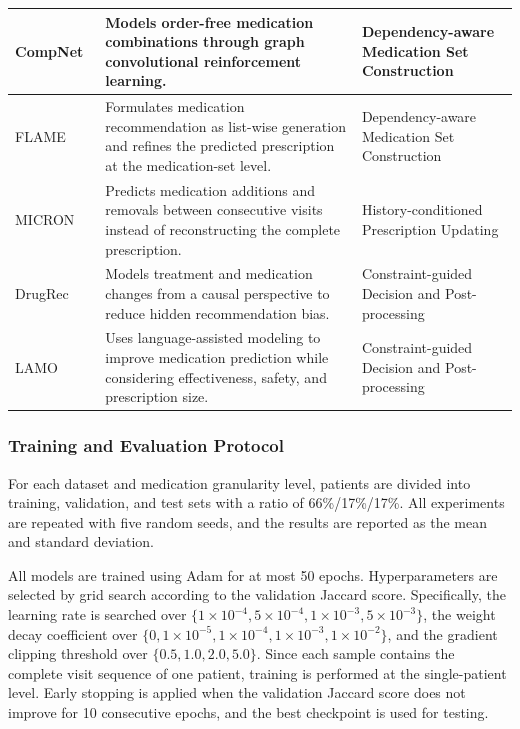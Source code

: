 \documentclass[manuscript,review]{acmart}
\begin{document}
\begin{longtable}{
    @{}
    L{0.13\textwidth}
    L{0.54\textwidth}
    L{0.27\textwidth}
    @{}
}
CompNet~\cite{wang2019compnet} &
Models order-free medication combinations through graph convolutional reinforcement learning. &
Dependency-aware Medication Set Construction \\
\hline

FLAME~\cite{fan2026fine} &
Formulates medication recommendation as list-wise generation and refines the predicted prescription at the medication-set level. &
Dependency-aware Medication Set Construction \\
\hline

MICRON~\cite{yang2021micron} &
Predicts medication additions and removals between consecutive visits instead of reconstructing the complete prescription. &
History-conditioned Prescription Updating \\
\hline

DrugRec~\cite{sun2022debiased} &
Models treatment and medication changes from a causal perspective to reduce hidden recommendation bias. &
Constraint-guided Decision and Post-processing \\
\hline

LAMO~\cite{zhao2025lamo} &
Uses language-assisted modeling to improve medication prediction while considering effectiveness, safety, and prescription size. &
Constraint-guided Decision and Post-processing \\

\end{longtable}

\endgroup

\subsubsection{Training and Evaluation Protocol}

For each dataset and medication granularity level, patients are divided into training, validation, and test sets with a ratio of 66\%/17\%/17\%. All experiments are repeated with five random seeds, and the results are reported as the mean and standard deviation.

All models are trained using Adam for at most 50 epochs. Hyperparameters are selected by grid search according to the validation Jaccard score. Specifically, the learning rate is searched over $\{1\times10^{-4}, 5\times10^{-4}, 1\times10^{-3}, 5\times10^{-3}\}$, the weight decay coefficient over $\{0, 1\times10^{-5}, 1\times10^{-4}, 1\times10^{-3}, 1\times10^{-2}\}$, and the gradient clipping threshold over $\{0.5, 1.0, 2.0, 5.0\}$. Since each sample contains the complete visit sequence of one patient, training is performed at the single-patient level. Early stopping is applied when the validation Jaccard score does not improve for 10 consecutive epochs, and the best checkpoint is used for testing.
\end{document}
